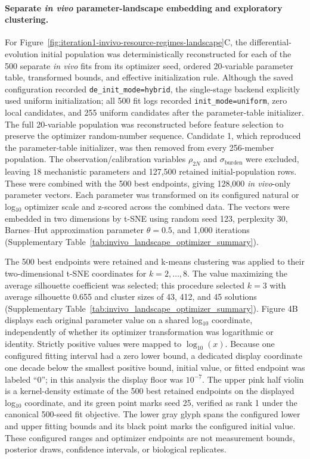 \documentclass[11pt]{article}
\begin{document}
\paragraph{Separate \textit{in vivo} parameter-landscape embedding and exploratory clustering.}
For Figure~\ref{fig:iteration1-invivo-resource-regimes-landscape}C, the differential-evolution initial population was deterministically reconstructed for each of the 500 separate \textit{in vivo} fits from its optimizer seed, ordered 20-variable parameter table, transformed bounds, and effective initialization rule. Although the saved configuration recorded \texttt{de\_init\_mode=hybrid}, the single-stage backend explicitly used uniform initialization; all 500 fit logs recorded \texttt{init\_mode=uniform}, zero local candidates, and 255 uniform candidates after the parameter-table initializer. The full 20-variable population was reconstructed before feature selection to preserve the optimizer random-number sequence. Candidate 1, which reproduced the parameter-table initializer, was then removed from every 256-member population. The observation/calibration variables \(\rho_{2N}\) and \(\sigma_{\mathrm{burden}}\) were excluded, leaving 18 mechanistic parameters and 127,500 retained initial-population rows. These were combined with the 500 best endpoints, giving 128,000 \textit{in vivo}-only parameter vectors. Each parameter was transformed on its configured natural or log$_{10}$ optimizer scale and z-scored across the combined data. The vectors were embedded in two dimensions by t-SNE using random seed 123, perplexity 30, Barnes--Hut approximation parameter \(\theta=0.5\), and 1,000 iterations (Supplementary Table~\ref{tab:invivo_landscape_optimizer_summary}).

The 500 best endpoints were retained and k-means clustering was applied to their two-dimensional t-SNE coordinates for \(k=2,\ldots,8\). The value maximizing the average silhouette coefficient was selected; this procedure selected \(k=3\) with average silhouette 0.655 and cluster sizes of 43, 412, and 45 solutions (Supplementary Table~\ref{tab:invivo_landscape_optimizer_summary}). Figure 4B displays each original parameter value on a shared log$_{10}$ coordinate, independently of whether its optimizer transformation was logarithmic or identity. Strictly positive values were mapped to $\log_{10}(x)$. Because one configured fitting interval had a zero lower bound, a dedicated display coordinate one decade below the smallest positive bound, initial value, or fitted endpoint was labeled ``0''; in this analysis the display floor was $10^{-7}$. The upper pink half violin is a kernel-density estimate of the 500 best retained endpoints on the displayed log$_{10}$ coordinate, and its green point marks seed 25, verified as rank 1 under the canonical 500-seed fit objective. The lower gray glyph spans the configured lower and upper fitting bounds and its black point marks the configured initial value. These configured ranges and optimizer endpoints are not measurement bounds, posterior draws, confidence intervals, or biological replicates.
\end{document}

